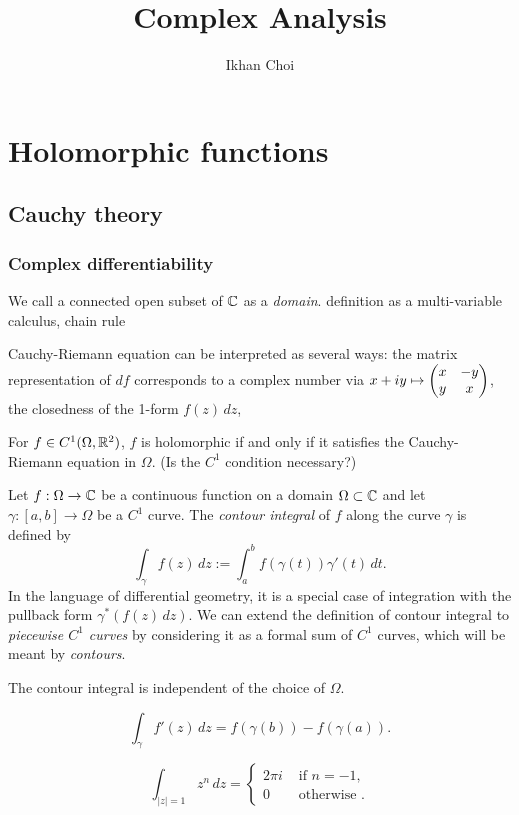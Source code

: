 \documentclass{../../large}
\begin{document}
\title{Complex Analysis}
\author{Ikhan Choi}
\maketitle
\tableofcontents


\part{Holomorphic functions}


\chapter{Cauchy theory}
\section{Complex differentiability}

\begin{prb}
We call a connected open subset of $\mathbb{C}$ as a \emph{domain}.
definition as a multi-variable calculus, chain rule
\end{prb}

\begin{prb}
Cauchy-Riemann equation can be interpreted as several ways: the matrix representation of $df$ corresponds to a complex number via $x+iy\mapsto\begin{pmatrix}x&-y\\y&x\end{pmatrix}$, the closedness of the 1-form $f(z)\,dz$, 
\begin{parts}
\item For $f\in C^1(\Omega,\mathbb{R}^2)$, $f$ is holomorphic if and only if it satisfies the Cauchy-Riemann equation in $\Omega$. (Is the $C^1$ condition necessary?)
\end{parts}
\end{prb}


\begin{prb}
Let $f:\Omega\to\mathbb{C}$ be a continuous function on a domain $\Omega\subset\mathbb{C}$ and let $\gamma:[a,b]\to\Omega$ be a $C^1$ curve.
The \emph{contour integral} of $f$ along the curve $\gamma$ is defined by
\[\int_\gamma f(z)\,dz:=\int_a^bf(\gamma(t))\gamma'(t)\,dt.\]
In the language of differential geometry, it is a special case of integration with the pullback form $\gamma^*(f(z)\,dz)$.
We can extend the definition of contour integral to \emph{piecewise $C^1$ curves} by considering it as a formal sum of $C^1$ curves, which will be meant by \emph{contours}.
\begin{parts}
\item The contour integral is independent of the choice of $\Omega$.
\item
\[\int_\gamma f'(z)\,dz=f(\gamma(b))-f(\gamma(a)).\]
\item
\[\int_{|z|=1}z^n\,dz=\begin{cases}2\pi i&\text{ if }n=-1,\\0&\text{ otherwise }.\end{cases}\]
\end{parts}
\end{prb}
\end{document}
